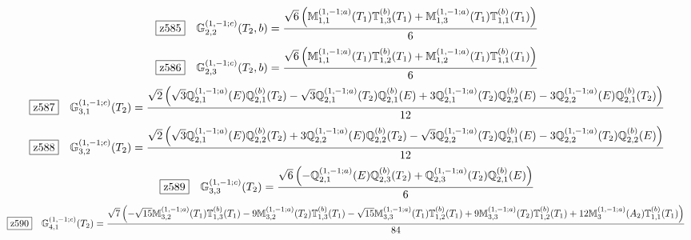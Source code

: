 \documentclass[fleqn,10pt,landscape]{jsarticle}
\begin{document}
\begin{dmath*}
\hspace*{3mm}\fbox{z585}\quad \mathbb{G}_{2,2}^{(1,-1;c)}(T_{2},b)=\frac{\sqrt{6} \left(\mathbb{M}_{1,1}^{(1,-1;a)}(T_{1}) \mathbb{T}_{1,3}^{(b)}(T_{1}) + \mathbb{M}_{1,3}^{(1,-1;a)}(T_{1}) \mathbb{T}_{1,1}^{(b)}(T_{1})\right)}{6}
\end{dmath*}
\begin{dmath*}
\hspace*{3mm}\fbox{z586}\quad \mathbb{G}_{2,3}^{(1,-1;c)}(T_{2},b)=\frac{\sqrt{6} \left(\mathbb{M}_{1,1}^{(1,-1;a)}(T_{1}) \mathbb{T}_{1,2}^{(b)}(T_{1}) + \mathbb{M}_{1,2}^{(1,-1;a)}(T_{1}) \mathbb{T}_{1,1}^{(b)}(T_{1})\right)}{6}
\end{dmath*}
\begin{dmath*}
\hspace*{3mm}\fbox{z587}\quad \mathbb{G}_{3,1}^{(1,-1;c)}(T_{2})=\frac{\sqrt{2} \left(\sqrt{3} \mathbb{Q}_{2,1}^{(1,-1;a)}(E) \mathbb{Q}_{2,1}^{(b)}(T_{2}) - \sqrt{3} \mathbb{Q}_{2,1}^{(1,-1;a)}(T_{2}) \mathbb{Q}_{2,1}^{(b)}(E) + 3 \mathbb{Q}_{2,1}^{(1,-1;a)}(T_{2}) \mathbb{Q}_{2,2}^{(b)}(E) - 3 \mathbb{Q}_{2,2}^{(1,-1;a)}(E) \mathbb{Q}_{2,1}^{(b)}(T_{2})\right)}{12}
\end{dmath*}
\begin{dmath*}
\hspace*{3mm}\fbox{z588}\quad \mathbb{G}_{3,2}^{(1,-1;c)}(T_{2})=\frac{\sqrt{2} \left(\sqrt{3} \mathbb{Q}_{2,1}^{(1,-1;a)}(E) \mathbb{Q}_{2,2}^{(b)}(T_{2}) + 3 \mathbb{Q}_{2,2}^{(1,-1;a)}(E) \mathbb{Q}_{2,2}^{(b)}(T_{2}) - \sqrt{3} \mathbb{Q}_{2,2}^{(1,-1;a)}(T_{2}) \mathbb{Q}_{2,1}^{(b)}(E) - 3 \mathbb{Q}_{2,2}^{(1,-1;a)}(T_{2}) \mathbb{Q}_{2,2}^{(b)}(E)\right)}{12}
\end{dmath*}
\begin{dmath*}
\hspace*{3mm}\fbox{z589}\quad \mathbb{G}_{3,3}^{(1,-1;c)}(T_{2})=\frac{\sqrt{6} \left(- \mathbb{Q}_{2,1}^{(1,-1;a)}(E) \mathbb{Q}_{2,3}^{(b)}(T_{2}) + \mathbb{Q}_{2,3}^{(1,-1;a)}(T_{2}) \mathbb{Q}_{2,1}^{(b)}(E)\right)}{6}
\end{dmath*}
\begin{dmath*}
\hspace*{3mm}\fbox{z590}\quad \mathbb{G}_{4,1}^{(1,-1;c)}(T_{2})=\frac{\sqrt{7} \left(- \sqrt{15} \mathbb{M}_{3,2}^{(1,-1;a)}(T_{1}) \mathbb{T}_{1,3}^{(b)}(T_{1}) - 9 \mathbb{M}_{3,2}^{(1,-1;a)}(T_{2}) \mathbb{T}_{1,3}^{(b)}(T_{1}) - \sqrt{15} \mathbb{M}_{3,3}^{(1,-1;a)}(T_{1}) \mathbb{T}_{1,2}^{(b)}(T_{1}) + 9 \mathbb{M}_{3,3}^{(1,-1;a)}(T_{2}) \mathbb{T}_{1,2}^{(b)}(T_{1}) + 12 \mathbb{M}_{3}^{(1,-1;a)}(A_{2}) \mathbb{T}_{1,1}^{(b)}(T_{1})\right)}{84}
\end{dmath*}
\end{document}
